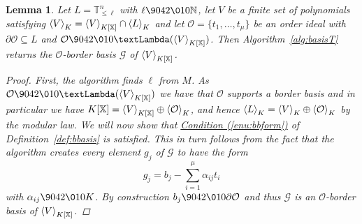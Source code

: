 \documentclass[11pt,oneside,english]{amsart}
\makeatletter
\numberwithin{equation}{section}
\numberwithin{figure}{section}
\theoremstyle{plain}
\theoremstyle{definition}
\theoremstyle{definition}
\theoremstyle{remark}
\theoremstyle{plain}
\newtheorem{lem}[thm]{Lemma}
\theoremstyle{plain}
\theoremstyle{plain}
\theoremstyle{problem@}
\makeatother
\begin{document}
\begin{lem}
  \label{lem:basisT}
  Let $L = {\mathbb{T}}^n_{\leq \ell}$ with $\ell{\9042\010} {\mathbb{N}}$,
  let $V$ be a finite set of polynomials satisfying
  \({{\left\langle {V}\right\rangle}\sb{K}} = {{\left\langle {V}\right\rangle}\sb{K[\mathbb{X}]}} \cap {{\left\langle {L}\right\rangle}\sb{K}}\)
  and
  let ${\mathcal{O}} = \{t_1, \dots, t_\mu\}$ be an order ideal with
  $\partial {\mathcal{O}} \subseteq L$
  and ${\mathcal{O}} {\9042\010} {\textLambda}({{\left\langle {V}\right\rangle}\sb{K[\mathbb{X}]}})$.
  Then Algorithm~\ref{alg:basisT} returns
  the ${\mathcal{O}}$-border basis $\mathcal G$ of ${{\left\langle {V}\right\rangle}\sb{K[\mathbb{X}]}}$.
\begin{proof}
First, the algorithm finds \(\ell\) from \(M\).
As ${\mathcal{O}} {\9042\010} {\textLambda}({{\left\langle {V}\right\rangle}\sb{K[\mathbb{X}]}})$ we have that ${\mathcal{O}}$ supports a border
basis and in particular we have ${K[\mathbb{X}]} = {{\left\langle {V}\right\rangle}\sb{K[\mathbb{X}]}} \oplus {{\left\langle {\mathcal{O}}\right\rangle}\sb{K}}$,
and hence \({{\left\langle {L}\right\rangle}\sb{K}} = {{\left\langle {V}\right\rangle}\sb{K}} \oplus {{\left\langle {\mathcal{O}}\right\rangle}\sb{K}}\)
by the modular law.
We will now show
that \hyperref[enu:bbform]{Condition (\ref*{enu:bbform})} of
Definition~\ref{def:bbasis} is
satisfied. This in turn follows from the fact that
the algorithm creates every element $g_j$ of $\mathcal G$ to have the form
\[g_j =b_{j}-\sum_{i=1}^{\mu}\alpha_{ij}t_{i}\] with $\alpha_{ij} {\9042\010} K$. By
construction $b_j {\9042\010} \partial {\mathcal{O}}$ and thus $\mathcal G$ is an ${\mathcal{O}}$-border
basis of ${{\left\langle {V}\right\rangle}\sb{K[\mathbb{X}]}}$.
\end{proof}
\end{lem}
\end{document}
